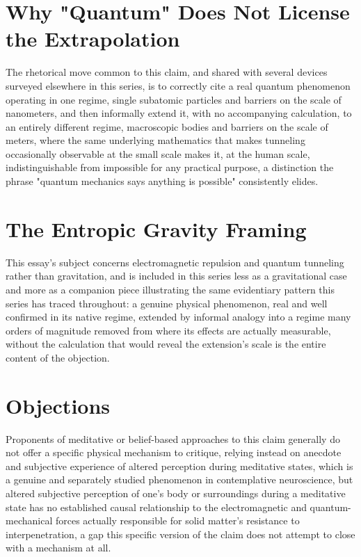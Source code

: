 \documentclass[11pt]{article}
\begin{document}
\section{Why "Quantum" Does Not License the Extrapolation}

The rhetorical move common to this claim, and shared with several devices surveyed elsewhere in this series, is to correctly cite a real quantum phenomenon operating in one regime, single subatomic particles and barriers on the scale of nanometers, and then informally extend it, with no accompanying calculation, to an entirely different regime, macroscopic bodies and barriers on the scale of meters, where the same underlying mathematics that makes tunneling occasionally observable at the small scale makes it, at the human scale, indistinguishable from impossible for any practical purpose, a distinction the phrase "quantum mechanics says anything is possible" consistently elides.

\section{The Entropic Gravity Framing}

This essay's subject concerns electromagnetic repulsion and quantum tunneling rather than gravitation, and is included in this series less as a gravitational case and more as a companion piece illustrating the same evidentiary pattern this series has traced throughout: a genuine physical phenomenon, real and well confirmed in its native regime, extended by informal analogy into a regime many orders of magnitude removed from where its effects are actually measurable, without the calculation that would reveal the extension's scale is the entire content of the objection.

\section{Objections}

Proponents of meditative or belief-based approaches to this claim generally do not offer a specific physical mechanism to critique, relying instead on anecdote and subjective experience of altered perception during meditative states, which is a genuine and separately studied phenomenon in contemplative neuroscience, but altered subjective perception of one's body or surroundings during a meditative state has no established causal relationship to the electromagnetic and quantum-mechanical forces actually responsible for solid matter's resistance to interpenetration, a gap this specific version of the claim does not attempt to close with a mechanism at all.
\end{document}
